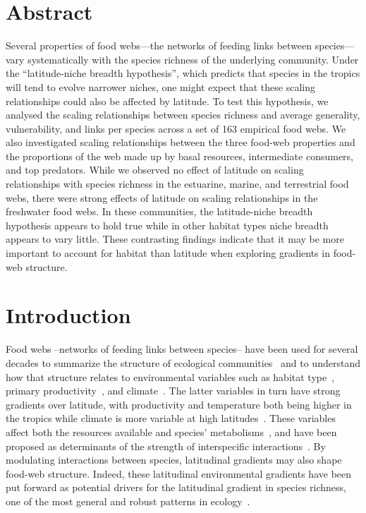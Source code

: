 \documentclass[12pt]{article}
\begin{document}
\begin{spacing}{1.0}
\section*{Abstract}

Several properties of food webs---the networks of feeding links between
species---vary systematically with the species richness of the underlying
community.  Under the ``latitude-niche breadth hypothesis'', which predicts
that species in the tropics will tend to evolve narrower niches, one might
expect that these scaling relationships could also be affected by latitude. To
test this hypothesis, we analysed the scaling relationships between species
richness and average generality, vulnerability, and links per species across a
set of 163 empirical food webs.  We also investigated scaling relationships
between the three food-web properties and the proportions of the web made up
by basal resources, intermediate consumers, and top predators. While we
observed no effect of latitude on scaling relationships with species richness
in the estuarine, marine, and terrestrial food webs, there were strong effects
of latitude on scaling relationships in the freshwater food webs. In these
communities, the latitude-niche breadth hypothesis appears to hold true while
in other habitat types niche breadth appears to vary little. These contrasting
findings indicate that it may be more important to account for habitat than
latitude when exploring gradients in food-web structure.


\section*{Introduction} 

  Food webs --networks of feeding links between species-- have been used for several decades to summarize the structure of 
  ecological communities~\citep{Petchey2008,Williams2000,Paine1966} and to understand how that structure relates to environmental variables 
  such as habitat type~\citep{Shurin2006,Briand1983}, primary productivity~\citep{Vermaat2009,Thompson2005a,Townsend1998}, and climate~\citep{Baiser2012,Petchey2010}. The latter
  variables in turn have strong gradients over latitude, with productivity and temperature both being higher in the tropics while 
  climate is more variable at high latitudes~\citep{Field1998}. These variables affect both the resources available and species' 
  metabolisms~\citep{Hechinger2011,White2011,OConnor2009,White2007}, and have been proposed as determinants of the strength of 
  interspecific interactions~\citep{Lang2012,Schleuning2012,Schemske2009}. 
  By modulating interactions between species, latitudinal gradients may also shape food-web structure.
  Indeed, these latitudinal environmental gradients have been put forward as potential drivers for the 
  latitudinal gradient in species richness, one of the most general and robust patterns in ecology~\citep{Schemske2009,Macpherson2002,Kaufman1995}.


\end{spacing}
\end{document}
